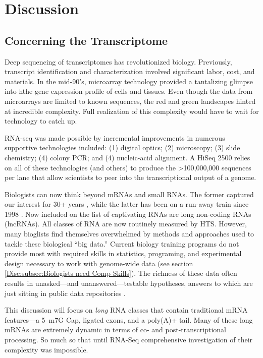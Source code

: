 \chapter{Discussion} 
\label{Disc}
\section{Concerning the Transcriptome}
  \label{Disc:sec:Future of Dynamic long RNAs}

  Deep sequencing of transcriptomes has revolutionized biology. Previously, transcript identification and characterization involved significant labor, cost, and materials. In the mid-90's, microarray technology \citep{Schena1995a} provided a tantalizing glimpse into hthe gene expression profile of cells and tissues. Even though the data from microarrays are limited to known sequences, the red and green landscapes hinted at incredible complexity. Full realization of this complexity would have to wait for technology to catch up.

  RNA-seq was made possible by incremental improvements in numerous supportive technologies included: (1) digital optics; (2) microscopy; (3) slide chemistry; (4) colony PCR; and (4) nucleic-acid alignment. A HiSeq 2500 relies on all of these technologies (and others) to produce the >100,000,000 sequences per lane that allow scientists to peer into the transcriptional output of a genome.

  Biologists can now think beyond mRNAs and small RNAs. The former captured our interest for 30+ years \citep{Furuichi1975,Wei1975}, while the latter has been on a run-away train since 1998 \citep{Fire1998}. Now included on the list of captivating RNAs are long non-coding RNAs (lncRNAs). All classes of RNA are now routinely measured by HTS. However, many bioglists find themselves overwhelmed by methods and approaches used to tackle these biological ``big data.'' Current biology training programs do not provide most with required skills in statistics, programing, and experimental design necessary to work with genome-wide data (see section \ref{Disc:subsec:Biologists need Comp Skills}). The richness of these data often results in unasked---and unanswered---testable hypotheses, answers to which are just sitting in public data repositories \citep{Plocik2013}.

  This discussion will focus on \textit{long} RNA classes that contain traditional mRNA features---a 5\textprime~m7G Cap, ligated exons, and a poly(A)+ tail. Many of these long mRNAs are extremely dynamic in terms of co- and post-transcriptional processing. So much so that until RNA-Seq comprehensive investigation of their complexity was impossible.

